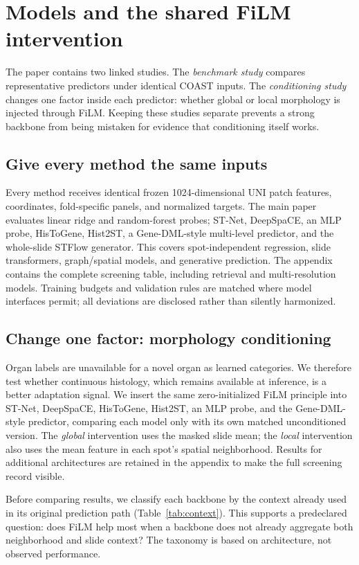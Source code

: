 \section{Models and the shared FiLM intervention}
\label{sec:models}
The paper contains two linked studies. The \emph{benchmark study} compares representative predictors
under identical COAST inputs. The \emph{conditioning study} changes one factor inside each predictor:
whether global or local morphology is injected through FiLM. Keeping these studies separate prevents
a strong backbone from being mistaken for evidence that conditioning itself works.

\subsection{Give every method the same inputs}
Every method receives identical frozen 1024-dimensional UNI patch features, coordinates, fold-specific
panels, and normalized targets. The main paper evaluates linear ridge and random-forest probes;
ST-Net, DeepSpaCE, an MLP probe, HisToGene, Hist2ST, a Gene-DML-style multi-level predictor,
and the whole-slide STFlow generator. This covers
spot-independent regression, slide transformers, graph/spatial models, and generative prediction.
The appendix contains the complete screening table, including retrieval and multi-resolution models.
Training budgets and validation rules are matched where model
interfaces permit; all deviations are disclosed rather than silently harmonized.

\subsection{Change one factor: morphology conditioning}
Organ labels are unavailable for a novel organ as learned categories. We therefore test whether
continuous histology, which remains available at inference, is a better adaptation signal. We insert
the same zero-initialized FiLM principle into ST-Net, DeepSpaCE, HisToGene, Hist2ST, an MLP probe,
and the Gene-DML-style predictor,
comparing each model only with its own matched unconditioned version. The
\emph{global} intervention uses the masked slide mean; the \emph{local} intervention also uses the
mean feature in each spot's spatial neighborhood. Results for additional architectures are retained
in the appendix to make the full screening record visible.

Before comparing results, we classify each backbone by the context already used in its original
prediction path (Table~\ref{tab:context}). This supports a predeclared question: does FiLM help most
when a backbone does not already aggregate both neighborhood and slide context? The taxonomy is based
on architecture, not observed performance.

